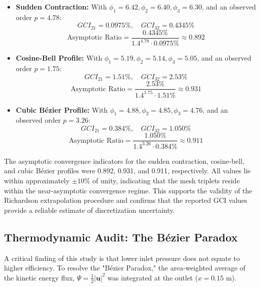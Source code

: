 \documentclass[12pt, a4paper]{article}
\begin{document}
\begin{itemize}
	\item \textbf{Sudden Contraction:} 
	With $\phi_1 = 6.42, \phi_2 = 6.40, \phi_3 = 6.30$, and an observed order $p = 4.78$:
	\begin{equation*}
		GCI_{21} = 0.0975\%, \quad GCI_{32} = 0.4345\%
	\end{equation*}
	\begin{equation*}
		\text{Asymptotic Ratio} = \frac{0.4345\%}{1.4^{4.78} \cdot 0.0975\%} \approx 0.892
	\end{equation*}
	
	\item \textbf{Cosine-Bell Profile:} 
	With $\phi_1 = 5.19, \phi_2 = 5.14, \phi_3 = 5.05$, and an observed order $p = 1.75$:
	\begin{equation*}
		GCI_{21} = 1.51\%, \quad GCI_{32} = 2.53\%
	\end{equation*}
	\begin{equation*}
		\text{Asymptotic Ratio} = \frac{2.53\%}{1.4^{1.75} \cdot 1.51\%} \approx 0.931
	\end{equation*}
	
	\item \textbf{Cubic B\'{e}zier Profile:} 
	With $\phi_1 = 4.88, \phi_2 = 4.85, \phi_3 = 4.76$, and an observed order $p = 3.26$:
	\begin{equation*}
		GCI_{21} = 0.384\%, \quad GCI_{32} = 1.050\%
	\end{equation*}
	\begin{equation*}
		\text{Asymptotic Ratio} = \frac{1.050\%}{1.4^{3.26} \cdot 0.384\%} \approx 0.911
	\end{equation*}
\end{itemize}

The asymptotic convergence indicators for the sudden contraction, cosine-bell, and cubic Bézier profiles were 0.892, 0.931, and 0.911, respectively. All values lie within approximately $\pm10\%$ of unity, indicating that the mesh triplets reside within the near-asymptotic convergence regime. This supports the validity of the Richardson extrapolation procedure and confirms that the reported GCI values provide a reliable estimate of discretization uncertainty. 

\subsection{Thermodynamic Audit: The Bézier Paradox}
A critical finding of this study is that lower inlet pressure does not equate to higher efficiency. To resolve the "Bézier Paradox," the area-weighted average of the kinetic energy flux, $\Psi = \frac{1}{2} |\mathbf{u}|^2$ was integrated at the outlet ($x = 0.15$ m).
\end{document}
